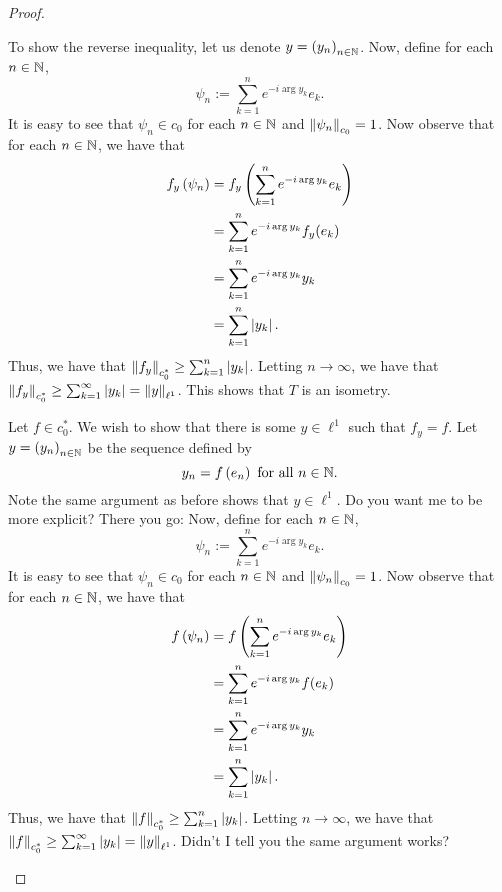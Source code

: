 \begin{proof}
\begin{enumerate}[label=(\alph*)]
     To show the reverse inequality, let us denote $y = \left( y_{n} \right)_{n\in \mathbb N}$. Now, define for each $n \in \mathbb N$,
     \begin{equation*}
	 \psi _{n} := \sum_{k=1}^{n} e^{-i \arg y_{k}} e_{k}.
     \end{equation*}
     It is easy to see that $\psi _{n}  \in c_{0}$ for each $n\in \mathbb N$ and $\left\lVert \psi_{n} \right\rVert_{c_{0}}=1$. Now observe that for each $n\in \mathbb N$, we have that
     \begin{align*}
	 f_{y} \left( \psi_{n} \right) &= f_{y} \left(  \sum_{k=1}^{n} e^{-i \arg y_{k}} e_{k} \right) \\
	 &= \sum_{k=1}^{n} e^{-i \arg y_{k}} f_{y}(e_{k})  \\
	 &= \sum_{k=1}^{n} e^{-i \arg y_{k}} y_{k} \\
	 &= \sum_{k=1}^{n} \left\lvert y_{k} \right\rvert.
     \end{align*}
     Thus, we have that $\left\lVert f_{y} \right\rVert_{c_{0}^{*}} \ge \sum_{k=1}^{n} \left\lvert y_{k} \right\rvert$. Letting $n\to \infty$, we have that $\left\lVert f_{y} \right\rVert_{c_{0}^{*}} \ge \sum_{k=1}^{\infty} \left\lvert y_{k} \right\rvert = \left\lVert y \right\rVert_{\ell ^{1}}$. This shows that $T$ is an isometry.

     Let $f\in c_{0}^{*}$. We wish to show that there is some $y \in \ell ^{1}$ such that $f_{y} = f$. Let $y= \left( y_{n} \right)_{n\in \mathbb N}$ be the sequence defined by 
     \begin{equation*}
	 y_{n} = f\left( e_{n} \right) \text{ for all } n \in \mathbb N.
     \end{equation*}
     Note the same argument as before shows that $y \in \ell ^{1}$. Do you want me to be more explicit? There you go:
Now, define for each $n \in \mathbb N$,
     \begin{equation*}
	 \psi _{n} := \sum_{k=1}^{n} e^{-i \arg y_{k}} e_{k}.
     \end{equation*}
     It is easy to see that $\psi _{n}  \in c_{0}$ for each $n\in \mathbb N$ and $\left\lVert \psi_{n} \right\rVert_{c_{0}}=1$. Now observe that for each $n\in \mathbb N$, we have that
     \begin{align*}
	 f \left( \psi_{n} \right) &= f \left(  \sum_{k=1}^{n} e^{-i \arg y_{k}} e_{k} \right) \\
	 &= \sum_{k=1}^{n} e^{-i \arg y_{k}} f(e_{k})  \\
	 &= \sum_{k=1}^{n} e^{-i \arg y_{k}} y_{k} \\
	 &= \sum_{k=1}^{n} \left\lvert y_{k} \right\rvert.
     \end{align*}
     Thus, we have that $\left\lVert f \right\rVert_{c_{0}^{*}} \ge \sum_{k=1}^{n} \left\lvert y_{k} \right\rvert$. Letting $n\to \infty$, we have that $\left\lVert f \right\rVert_{c_{0}^{*}} \ge \sum_{k=1}^{\infty} \left\lvert y_{k} \right\rvert = \left\lVert y \right\rVert_{\ell ^{1}}$. Didn't I tell you the same argument works?


\end{enumerate}
\end{proof}
